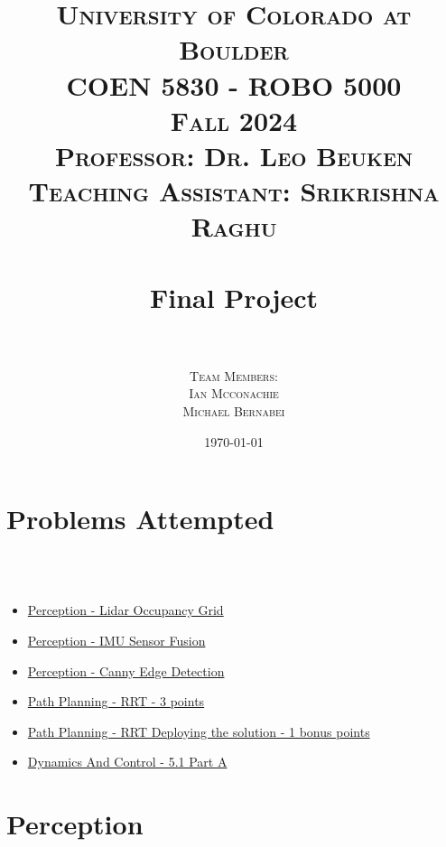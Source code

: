 \documentclass{article}
\title{
\normalfont \LARGE
\textsc{University of Colorado at Boulder} \\ [25pt] %
\textsc{COEN 5830 - ROBO 5000} \\ [20pt]
\textsc{Fall 2024} \\ [20pt]
\textsc{Professor: Dr. Leo Beuken} \\ [12pt]
\textsc{Teaching Assistant: Srikrishna Raghu} \\ [12pt]
\horrule{1pt} \\[0.4cm] %
\huge Final Project \\ %
\horrule{1pt} \\[0.6cm] %
}
\author{
  \textsc{ Team Members:} \\ [4 mm]
  \textsc{ Ian Mcconachie}\\[2mm]
  \textsc{ Michael Bernabei}\\[2mm]
}
\date{\normalsize\today} %
\numberwithin{equation}{section} %
\numberwithin{figure}{section} %
\numberwithin{table}{section} %
\begin{document}
\maketitle %
\thispagestyle{empty} %
\newpage




\tableofcontents
\listofalgorithms

\newpage

%

\section{Problems Attempted}
\\~\\
\begin{center}
 \begin{minipage}{.4\textwidth}
 \begin{itemize}
    \item \hyperref[sec:Perception]{Perception - Lidar Occupancy Grid}
    \item \hyperref[sec:SensorFusion]{Perception - IMU Sensor Fusion}
    \item \hyperref[sec:CannyEdge]{Perception - Canny Edge Detection }
    \item \hyperref[sec:RRT]{Path Planning - RRT - 3 points }
    \item \hyperref[sec:RRT_bonus]{Path Planning - RRT Deploying the solution - 1 bonus points}
    \item \hyperref[sec:DynAndCtrl]{Dynamics And Control - 5.1 Part A }
 \end{itemize}
 \end{minipage}
\end{center}


\newpage


\section{Perception}
\end{document}
